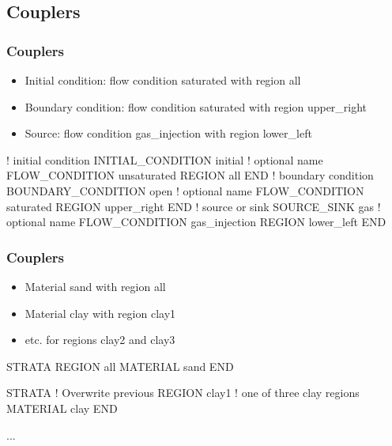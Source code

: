 \documentclass{beamer}
\newcommand\redcomment[1]{{{\color{red} #1}}}
\newcommand\bluecomment[1]{{{\color{blue} #1}}}
\newcommand\greencomment[1]{{{\color{green} #1}}}
\begin{document}
\subsection{Couplers}

\begin{frame}[fragile]\frametitle{Couplers}

\begin{itemize}
  \item \redcomment{Initial condition}: flow condition \greencomment{saturated} with region \greencomment{all}
  \item \redcomment{Boundary condition}: flow condition \greencomment{saturated} with region \greencomment{upper\_right}
  \item \redcomment{Source}: flow condition \greencomment{gas\_injection} with region \greencomment{lower\_left}
\end{itemize}

\begin{semiverbatim}\small
\bluecomment{! initial condition}
INITIAL_CONDITION initial \bluecomment{! optional name}
  FLOW_CONDITION unsaturated
  REGION all
END
\bluecomment{! boundary condition}
BOUNDARY_CONDITION open \bluecomment{! optional name}
  FLOW_CONDITION saturated
  REGION upper_right
END
\bluecomment{! source or sink }
SOURCE_SINK gas \bluecomment{! optional name}
  FLOW_CONDITION gas_injection
  REGION lower_left
END
\end{semiverbatim}
\end{frame}

\begin{frame}[fragile]\frametitle{Couplers}

\begin{itemize}
  \item{Material \greencomment{sand} with region \greencomment{all}}
  \item{Material \greencomment{clay} with region \greencomment{clay1}}
  \item{etc. for regions \greencomment{clay2} and \greencomment{clay3}}
\end{itemize}

\begin{semiverbatim}\small
STRATA
  REGION all
  MATERIAL sand
END

STRATA         \bluecomment{! Overwrite previous}
  REGION clay1 \bluecomment{! one of three clay regions}
  MATERIAL clay
END

...
\end{semiverbatim}
\end{frame}
\end{document}
